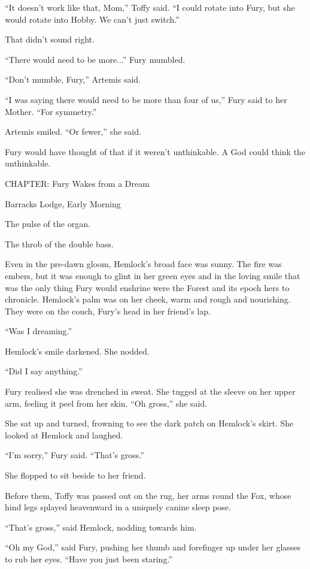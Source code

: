 \documentclass[11pt,a5paper]{article}
\begin{document}
``It doesn't work like that, Mom,'' Toffy said. ``I could rotate into Fury, but she would rotate into Hobby. We can't just switch.''

That didn't sound right.

``There would need to be more...'' Fury mumbled.

``Don't mumble, Fury,'' Artemis said.

``I was saying there would need to be more than four of us,'' Fury said to her Mother. ``For symmetry.''

Artemis smiled. ``Or fewer,'' she said.

Fury would have thought of that if it weren't unthinkable. A God could think the unthinkable.

CHAPTER: Fury Wakes from a Dream

Barracks Lodge, Early Morning



The pulse of the organ.

The throb of the double bass.

Even in the pre-dawn gloom, Hemlock's broad face was sunny. The fire was embers, but it was enough to glint in her green eyes and in the loving smile that was the only thing Fury would enshrine were the Forest and its epoch hers to chronicle. Hemlock's palm was on her cheek, warm and rough and nourishing. They were on the couch, Fury's head in her friend's lap.

``Was I dreaming.''

Hemlock's smile darkened. She nodded.

``Did I say anything.''

Fury realised she was drenched in sweat. She tugged at the sleeve on her upper arm, feeling it peel from her skin. ``Oh gross,'' she said.

She sat up and turned, frowning to see the dark patch on Hemlock's skirt. She looked at Hemlock and laughed.

``I'm sorry,'' Fury said. ``That's gross.''

She flopped to sit beside to her friend.

Before them, Toffy was passed out on the rug, her arms round the Fox, whose hind legs splayed heavenward in a uniquely canine sleep pose.

``That's gross,'' said Hemlock, nodding towards him.

``Oh my God,'' said Fury, pushing her thumb and forefinger up under her glasses to rub her eyes. ``Have you just been staring.''
\end{document}
